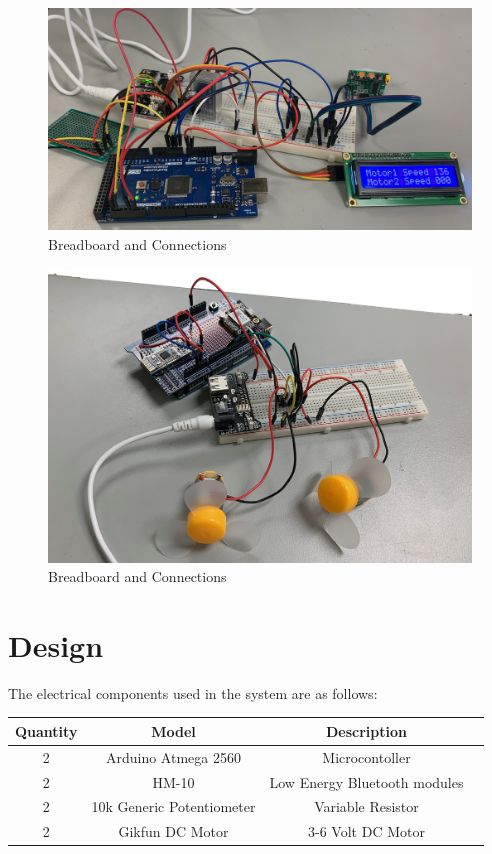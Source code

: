 \documentclass[a4paper,12pt]{article} %
\begin{document}
\begin{figure}[h!]
  \center
  \includegraphics[width=\textwidth]{connectionsimage_sensors.png}
  \caption{Breadboard and Connections}
  \label{fig:sensors}
\end{figure}

\begin{figure}[h!]
  \center
  \includegraphics[width=\textwidth]{connectionsimage_motors.png}
  \caption{Breadboard and Connections}
  \label{fig:motors}
\end{figure}

\section{Design}
The electrical components used in the system are as follows:
\begin{flushleft}

\begin{tabular}{cccc@{}}
\hline
Quantity  & Model & Description \\
 \hline
2  & Arduino Atmega 2560  & Microcontoller \\
2 & HM-10 & Low Energy Bluetooth modules \\
2 & 10k Generic Potentiometer & Variable Resistor \\
2  & Gikfun DC Motor & 3-6 Volt DC Motor \\
\end{tabular}
\end{flushleft}
\end{document}
